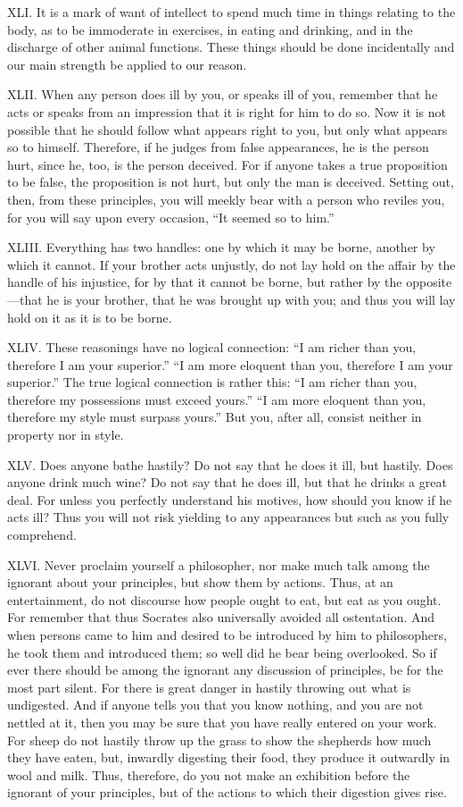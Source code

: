 \documentclass[a4paper]{article}
\begin{document}
XLI. It is a mark of want of intellect to spend much time in things relating
to the body, as to be immoderate in exercises, in eating and drinking,
and in the discharge of other animal functions. These things should be
done incidentally and our main strength be applied to our reason.


XLII. When any person does ill by you, or speaks ill of you, remember that he
acts or speaks from an impression that it is right for him to do so. Now
it is not possible that he should follow what appears right to you, but
only what appears so to himself. Therefore, if he judges from false
appearances, he is the person hurt, since he, too, is the person
deceived. For if anyone takes a true proposition to be false, the
proposition is not hurt, but only the man is deceived. Setting out, then,
from these principles, you will meekly bear with a person who reviles
you, for you will say upon every occasion, “It seemed so to him.”


XLIII. Everything has two handles: one by which it may be borne, another by
which it cannot. If your brother acts unjustly, do not lay hold on the
affair by the handle of his injustice, for by that it cannot be borne,
but rather by the opposite—that he is your brother, that he was brought
up with you; and thus you will lay hold on it as it is to be borne.


XLIV. These reasonings have no logical connection: “I am richer than you,
therefore I am your superior.” “I am more eloquent than you, therefore I
am your superior.” The true logical connection is rather this: “I am
richer than you, therefore my possessions must exceed yours.” “I am more
eloquent than you, therefore my style must surpass yours.” But you, after
all, consist neither in property nor in style.


XLV. Does anyone bathe hastily? Do not say that he does it ill, but hastily.
Does anyone drink much wine? Do not say that he does ill, but that he
drinks a great deal. For unless you perfectly understand his motives, how
should you know if he acts ill? Thus you will not risk yielding to any
appearances but such as you fully comprehend.


XLVI. Never proclaim yourself a philosopher, nor make much talk among the
ignorant about your principles, but show them by actions. Thus, at an
entertainment, do not discourse how people ought to eat, but eat as you
ought. For remember that thus Socrates also universally avoided all
ostentation. And when persons came to him and desired to be introduced by
him to philosophers, he took them and introduced them; so well did he
bear being overlooked. So if ever there should be among the ignorant any
discussion of principles, be for the most part silent. For there is great
danger in hastily throwing out what is undigested. And if anyone tells
you that you know nothing, and you are not nettled at it, then you may be
sure that you have really entered on your work. For sheep do not hastily
throw up the grass to show the shepherds how much they have eaten, but,
inwardly digesting their food, they produce it outwardly in wool and
milk. Thus, therefore, do you not make an exhibition before the ignorant
of your principles, but of the actions to which their digestion gives
rise.
\end{document}
